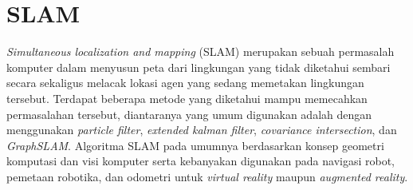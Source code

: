 \section{SLAM}
\label{sec:slam}

\emph{Simultaneous localization and mapping} (SLAM) merupakan sebuah permasalah komputer dalam menyusun peta dari lingkungan yang tidak diketahui sembari secara sekaligus melacak lokasi agen yang sedang memetakan lingkungan tersebut.
Terdapat beberapa metode yang diketahui mampu memecahkan permasalahan tersebut,
  diantaranya yang umum digunakan adalah dengan menggunakan \emph{particle filter}, \emph{extended kalman filter}, \emph{covariance intersection}, dan \emph{GraphSLAM}.
Algoritma SLAM pada umumnya berdasarkan konsep geometri komputasi dan visi komputer serta kebanyakan digunakan pada navigasi robot, pemetaan robotika, dan odometri untuk \emph{virtual reality} maupun \emph{augmented reality}.

